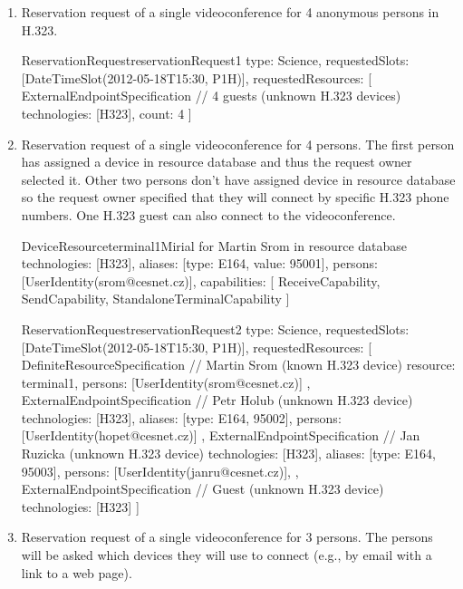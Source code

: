 \begin{enumerate}
\item Reservation request of a single videoconference for 4 anonymous persons in H.323.

\begin{EntityExample}{ReservationRequest}{reservationRequest1}{}
type: Science,
requestedSlots: [DateTimeSlot(2012-05-18T15:30, P1H)],
requestedResources: [
  ExternalEndpointSpecification { // 4 guests (unknown H.323 devices)
    technologies: [H323],
    count: 4
  }
]
\end{EntityExample}

\item Reservation request of a single videoconference for 4 persons. The first person  has assigned a device in resource database and thus the request owner selected it. Other two persons don't have assigned device in resource database so the request owner specified that they will connect by specific H.323 phone numbers. One H.323 guest can also connect to the videoconference.

\begin{EntityExample}{DeviceResource}{terminal1}{Mirial for Martin Srom in resource database}
technologies: [H323], 
aliases: [{type: E164, value: 95001}],
persons: [UserIdentity(srom@cesnet.cz)],
capabilities: [
  ReceiveCapability, SendCapability, StandaloneTerminalCapability
]
\end{EntityExample}

\begin{EntityExample}{ReservationRequest}{reservationRequest2}{}
type: Science,
requestedSlots: [DateTimeSlot(2012-05-18T15:30, P1H)],
requestedResources: [
  DefiniteResourceSpecification { // Martin Srom (known H.323 device)
    resource: terminal1,
    persons: [UserIdentity(srom@cesnet.cz)] 
  },
  ExternalEndpointSpecification { // Petr Holub (unknown H.323 device)
    technologies: [H323],
    aliases: [{type: E164, 95002}],
    persons: [UserIdentity(hopet@cesnet.cz)]
  },
  ExternalEndpointSpecification { // Jan Ruzicka (unknown H.323 device)
    technologies: [H323],
    aliases: [{type: E164, 95003}],
    persons: [UserIdentity(janru@cesnet.cz)], 
  },
  ExternalEndpointSpecification { // Guest (unknown H.323 device)
    technologies: [H323]
  }
]
\end{EntityExample}

\item Reservation request of a single videoconference for 3 persons. The persons will be asked which devices they will use to connect (e.g., by email with a link to a web page).


\end{enumerate}
